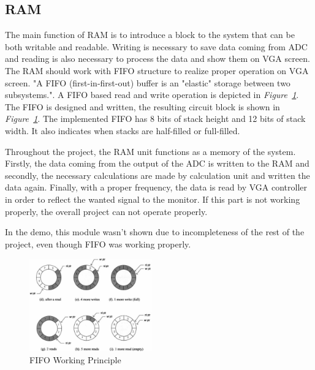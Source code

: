 \documentclass[paper]{IEEEtran}
\begin{document}
\subsection{RAM} \- \indent
	The main function of RAM is to introduce a block to the system that can be both writable and readable. Writing is necessary to save data coming from ADC and reading is also necessary to process the data and show them on VGA screen. The RAM should work with FIFO structure to realize proper operation on VGA screen. "A FIFO (first-in-first-out) buffer is an "elastic" storage between two subsystems."\cite{b3}. A FIFO based read and write operation is depicted in \textit{Figure~\ref{fig:fifo_diagram}}. The FIFO is designed and written, the resulting circuit block is shown in \textit{Figure~\ref{fig:fifo_diagram}}. The implemented FIFO has 8 bits of stack height and 12 bits of stack width. It also indicates when stacks are half-filled or full-filled.
	
	Throughout the project, the RAM unit functions as a memory of the system. Firstly, the data coming from the output of the ADC is written to the RAM and secondly, the necessary calculations are made by calculation unit and written the data again. Finally, with a proper frequency, the data is read by VGA controller in order to reflect the wanted signal to the monitor. If this part is not working properly, the overall project can not operate properly. 
	
	In the demo, this module wasn't shown due to incompleteness of the rest of the project, even though FIFO was working properly.
	
	\begin{figure}[t!]
		\setlength{\unitlength}{\textwidth}
		\center 
		\includegraphics[width=0.47\textwidth]{fifo_diagram}
		\caption{\label{fig:fifo_diagram}FIFO Working Principle\cite{b3}}
	\end{figure}
\end{document}
